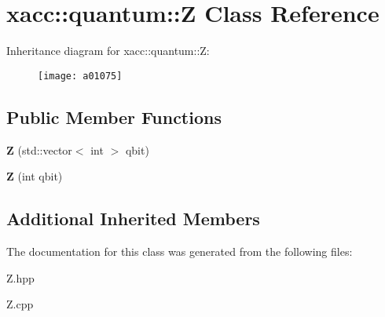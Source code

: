 \hypertarget{a01075}{}\section{xacc\+:\+:quantum\+:\+:Z Class Reference}
\label{a01075}
Inheritance diagram for xacc\+:\+:quantum\+:\+:Z\+:\begin{figure}[H]
\begin{center}
\leavevmode
\texttt{[image: a01075]}
\end{center}
\end{figure}
\subsection*{Public Member Functions}
\begin{DoxyCompactItemize}
\item 
\mbox{\label{a01075_a5f1d311b357faed8c2665fe20cf24aeb}} 
{\bfseries Z} (std\+::vector$<$ int $>$ qbit)
\item 
\mbox{\label{a01075_aa1bb7e533e7595e9ecd06879a2f8d2de}} 
{\bfseries Z} (int qbit)
\end{DoxyCompactItemize}
\subsection*{Additional Inherited Members}


The documentation for this class was generated from the following files\+:\begin{DoxyCompactItemize}
\item 
Z.\+hpp\item 
Z.\+cpp\end{DoxyCompactItemize}
